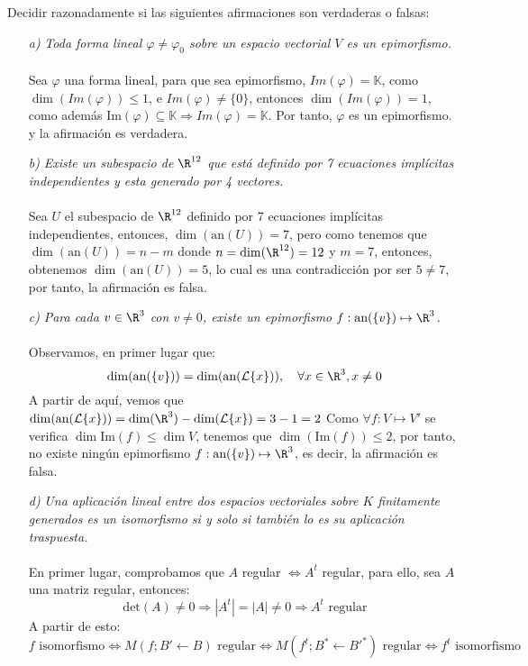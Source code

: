 \begin{ejercicio}
	Decidir razonadamente si las siguientes afirmaciones son verdaderas o falsas:
	\begin{itemize}
		\item[ \textit{a)}] \textit{Toda forma lineal $\varphi \neq \varphi_0$ sobre un espacio vectorial $V$ es un epimorfismo.} \\ \\
			Sea $\varphi$ una forma lineal, para que sea epimorfismo, $Im(\varphi) = \mathbb{K}$, como $\dim(Im(\varphi)) \leq 1$, e $Im(\varphi) \neq \{0\}$, entonces
			$\dim(Im(\varphi)) = 1$, como además Im$(\varphi) \subseteq \mathbb{K} \Rightarrow Im(\varphi) = \mathbb{K} .$ Por tanto, $\varphi$ es un epimorfismo. y la afirmación es verdadera.
		\item[ \textit{b)}] \textit{Existe un subespacio de $\R^{12}$ que está definido por 7 ecuaciones implícitas independientes y
				esta generado por 4 vectores.}
			\\ \\
			Sea $U$ el subespacio de $\R^{12}$ definido por 7 ecuaciones implícitas independientes, entonces, $\dim(\text{an}(U)) = 7$, pero como
			tenemos que $\dim(\text{an}(U))= n - m$ donde $n = \dim(\R^{12}) = 12$ y $m = 7$, entonces, obtenemos $\dim(\text{an}(U)) = 5$, lo cual es una contradicción
			por ser $5 \neq 7$, por tanto, la afirmación es falsa.
		\item[ \textit{c)}] \textit{Para cada $v \in \R^3$ con $v \neq 0$, existe un epimorfismo $f : \text{an}(\{v\}) \mapsto \R^3$.} \\ \\
			Observamos, en primer lugar que:
			\begin{equation*}
				\dim(\text{an}(\{v\})) = \dim(\text{an}(\mathcal{L}\{x\})), \quad \forall x \in \R^3, x \neq 0
			\end{equation*}
			A partir de aquí, vemos que $\dim(\text{an}(\mathcal{L}\{x\})) = \dim(\R^3)-\dim(\mathcal{L}\{x\}) = 3-1=2$
			Como $\forall f : V \mapsto V'$ se verifica $\dim{\text{Im}(f)} \leq \dim{V}$, tenemos que $\dim(\text{Im}(f)) \leq 2$, por tanto,
			no existe ningún epimorfismo $f : \text{an}(\{v\}) \mapsto \R^3$, es decir, la afirmación es falsa.
		\item[ \textit{d)}] \textit{Una aplicación lineal entre dos espacios vectoriales sobre $K$ finitamente generados es un isomorfismo
				si y solo si también lo es su aplicación traspuesta.}
			\\ \\
			En primer lugar, comprobamos que $A$ regular $\Leftrightarrow A^t$ regular, para ello, sea $A$ una matriz regular, entonces:
			\begin{equation*}
				\text{det}(A) \neq 0 \Rightarrow |A^t| = |A| \neq 0 \Rightarrow A^t \text{ regular}
			\end{equation*}
			A partir de esto:
			\begin{equation*}
				f \text{ isomorfismo} \Leftrightarrow M(f;B' \leftarrow B) \text{ regular} \Leftrightarrow M(f^t;B^* \leftarrow B'^{*}) \text{ regular} \Leftrightarrow f^t \text{ isomorfismo}
			\end{equation*}
	\end{itemize}
\end{ejercicio}